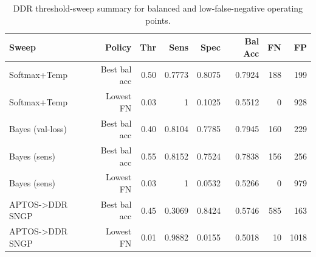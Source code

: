 \begin{table}[t]
\centering
\small
\caption{DDR threshold-sweep summary for balanced and low-false-negative operating points.}
\label{tab:ddr-thresholds}
\begin{tabular}{lrrrrrrr}
\toprule
Sweep & Policy & Thr & Sens & Spec & Bal Acc & FN & FP \\
\midrule
Softmax+Temp & Best bal acc & 0.50 & 0.7773 & 0.8075 & 0.7924 & 188 & 199 \\
Softmax+Temp & Lowest FN & 0.03 & 1 & 0.1025 & 0.5512 & 0 & 928 \\
Bayes (val-loss) & Best bal acc & 0.40 & 0.8104 & 0.7785 & 0.7945 & 160 & 229 \\
Bayes (sens) & Best bal acc & 0.55 & 0.8152 & 0.7524 & 0.7838 & 156 & 256 \\
Bayes (sens) & Lowest FN & 0.03 & 1 & 0.0532 & 0.5266 & 0 & 979 \\
APTOS->DDR SNGP & Best bal acc & 0.45 & 0.3069 & 0.8424 & 0.5746 & 585 & 163 \\
APTOS->DDR SNGP & Lowest FN & 0.01 & 0.9882 & 0.0155 & 0.5018 & 10 & 1018 \\
\bottomrule
\end{tabular}
\end{table}
